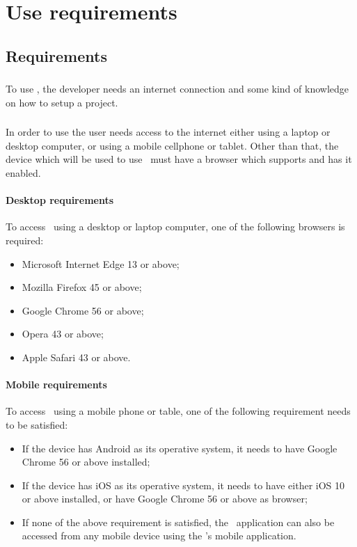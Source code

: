 \section{Use requirements}

\subsection{Requirements}
\subsubsection{\progettoShort}
To use \progettoShort, the developer needs an internet connection and some kind of knowledge on how to setup a  project.

\subsubsection{\app}
In order to use \app the user needs access to the internet either using a laptop or desktop computer, or using a mobile cellphone or tablet. Other than that, the device which will be used to use \app\ must have a browser which supports  and has it enabled.

\paragraph{Desktop requirements}
To access \app\ using a desktop or laptop computer, one of the following browsers is required:
\begin{itemize}
	\item Microsoft Internet Edge 13 or above;
	\item Mozilla Firefox 45 or above;
	\item Google Chrome 56 or above;
	\item Opera 43 or above;
	\item Apple Safari 43 or above.
\end{itemize}

\paragraph{Mobile requirements}
To access \app\ using a mobile phone or table, one of the following requirement needs to be satisfied:
\begin{itemize}
	\item If the device has Android as its operative system, it needs to have Google Chrome 56 or above installed;
	\item If the device has iOS as its operative system, it needs to have either iOS 10 or above installed, or have Google Chrome 56 or above as browser;
	\item If none of the above requirement is satisfied, the \app{}lication can also be accessed from any mobile device using the 's mobile application.
\end{itemize}


